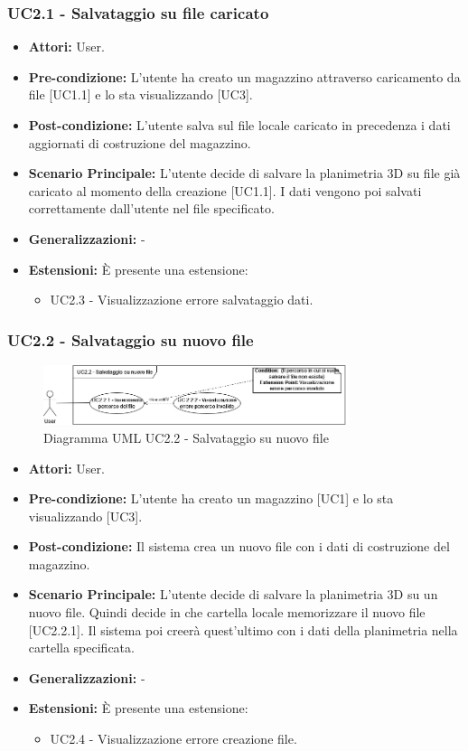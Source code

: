 \subsubsection{UC2.1 - Salvataggio su file caricato}
\begin{itemize}
    \item \textbf{Attori:} User.
    \item \textbf{Pre-condizione:} L'utente ha creato un magazzino attraverso caricamento da file [UC1.1] e lo sta visualizzando [UC3].
    \item \textbf{Post-condizione:} L'utente salva sul file locale caricato in precedenza i dati aggiornati di costruzione del magazzino.
    \item \textbf{Scenario Principale:} L'utente decide di salvare la planimetria 3D su file già caricato al momento della creazione [UC1.1]. I dati vengono poi salvati correttamente dall'utente nel file specificato.
    \item \textbf{Generalizzazioni:} -
    \item \textbf{Estensioni:} È presente una estensione:
    \begin{itemize}
        \item UC2.3 - Visualizzazione errore salvataggio dati.
    \end{itemize}
\end{itemize}


\subsubsection{UC2.2 - Salvataggio su nuovo file}
\begin{figure}[H]
  \centering
  \includegraphics[width=0.8\textwidth]{UC_diagrams_1-10/UC2.2.drawio.png}
   \caption{Diagramma UML UC2.2 - Salvataggio su nuovo file}
\end{figure}
\begin{itemize}
    \item \textbf{Attori:} User.
    \item \textbf{Pre-condizione:} L'utente ha creato un magazzino [UC1] e lo sta visualizzando [UC3].
    \item \textbf{Post-condizione:} Il sistema crea un nuovo file con i dati di costruzione del magazzino.
    \item \textbf{Scenario Principale:} L'utente decide di salvare la planimetria 3D su un nuovo file. Quindi decide in che cartella locale memorizzare il nuovo file [UC2.2.1]. Il sistema poi creerà quest'ultimo con i dati della planimetria nella cartella specificata.
    \item \textbf{Generalizzazioni:} -
    \item \textbf{Estensioni:} È presente una estensione:
    \begin{itemize}
        \item UC2.4 - Visualizzazione errore creazione file.
    \end{itemize}
\end{itemize}


